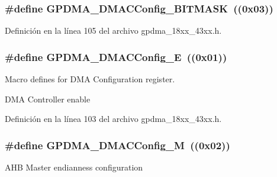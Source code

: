 \subsubsection[{\texorpdfstring{G\+P\+D\+M\+A\+\_\+\+D\+M\+A\+C\+Config\+\_\+\+B\+I\+T\+M\+A\+SK}{GPDMA_DMACConfig_BITMASK}}]{\setlength{\rightskip}{0pt plus 5cm}\#define G\+P\+D\+M\+A\+\_\+\+D\+M\+A\+C\+Config\+\_\+\+B\+I\+T\+M\+A\+SK~((0x03))}\hypertarget{group___g_p_d_m_a__18_x_x__43_x_x_gad882001a1a177628f45ffa5a57a2c894}{}\label{group___g_p_d_m_a__18_x_x__43_x_x_gad882001a1a177628f45ffa5a57a2c894}


Definición en la línea 105 del archivo gpdma\+\_\+18xx\+\_\+43xx.\+h.

\subsubsection[{\texorpdfstring{G\+P\+D\+M\+A\+\_\+\+D\+M\+A\+C\+Config\+\_\+E}{GPDMA_DMACConfig_E}}]{\setlength{\rightskip}{0pt plus 5cm}\#define G\+P\+D\+M\+A\+\_\+\+D\+M\+A\+C\+Config\+\_\+E~((0x01))}\hypertarget{group___g_p_d_m_a__18_x_x__43_x_x_ga253822f2712564a42379a76d9447cde4}{}\label{group___g_p_d_m_a__18_x_x__43_x_x_ga253822f2712564a42379a76d9447cde4}


Macro defines for D\+MA Configuration register. 

D\+MA Controller enable 

Definición en la línea 103 del archivo gpdma\+\_\+18xx\+\_\+43xx.\+h.

\subsubsection[{\texorpdfstring{G\+P\+D\+M\+A\+\_\+\+D\+M\+A\+C\+Config\+\_\+M}{GPDMA_DMACConfig_M}}]{\setlength{\rightskip}{0pt plus 5cm}\#define G\+P\+D\+M\+A\+\_\+\+D\+M\+A\+C\+Config\+\_\+M~((0x02))}\hypertarget{group___g_p_d_m_a__18_x_x__43_x_x_ga0f2a7e8c8704f5a897f911ac3a8617e3}{}\label{group___g_p_d_m_a__18_x_x__43_x_x_ga0f2a7e8c8704f5a897f911ac3a8617e3}
A\+HB Master endianness configuration 

